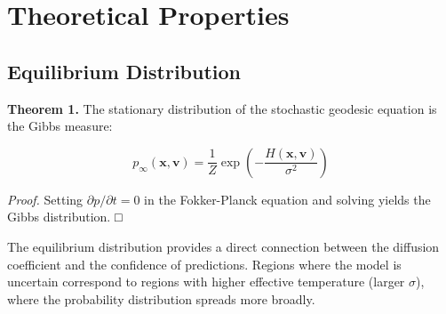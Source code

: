 \documentclass[12pt,a4paper]{article}
\begin{document}
\section{Theoretical Properties}

\subsection{Equilibrium Distribution}

\textbf{Theorem 1.} The stationary distribution of the stochastic geodesic equation is the Gibbs measure:

\begin{equation}
p_\infty(\mathbf{x}, \mathbf{v}) = \frac{1}{Z} \exp\left(-\frac{H(\mathbf{x}, \mathbf{v})}{\sigma^2}\right)
\end{equation}

\textit{Proof.} Setting $\partial p/\partial t = 0$ in the Fokker-Planck equation and solving yields the Gibbs distribution. □

The equilibrium distribution provides a direct connection between the diffusion coefficient and the confidence of predictions. Regions where the model is uncertain correspond to regions with higher effective temperature (larger $\sigma$), where the probability distribution spreads more broadly.
\end{document}
